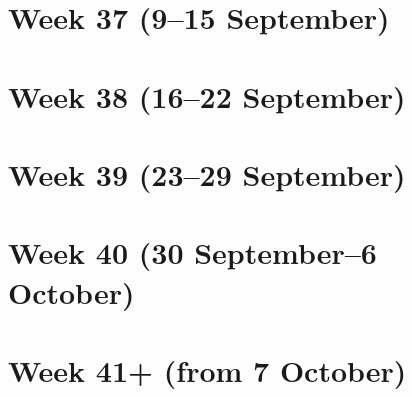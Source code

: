 \documentclass{article}
\begin{document}
\section{Week 37 (9--15 September)}

\section{Week 38 (16--22 September)}

\section{Week 39 (23--29 September)}

\section{Week 40 (30 September--6 October)}

\section{Week 41+ (from 7 October)}
\end{document}
